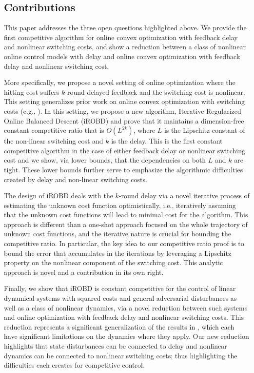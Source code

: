 \subsection{Contributions}
This paper addresses the three open questions highlighted above.  We provide the first competitive algorithm for online convex optimization with feedback delay and nonlinear switching costs, and show a reduction between a class of nonlinear online control models with delay and online convex optimization with feedback delay and nonlinear switching cost. 

More specifically, we propose a novel setting of online optimization where the hitting cost suffers $k$-round delayed feedback and the switching cost is nonlinear. This setting generalizes prior work on online convex optimization with switching costs (e.g., \citep{goel2019beyond,shi2020online}).  In this setting, we propose a new algorithm, Iterative Regularized Online Balanced Descent (iROBD) and prove that it maintains a dimension-free constant competitive ratio that is $O(L^{2k})$, where $L$ is the Lipschitz constant of the non-linear switching cost and $k$ is the delay.  This is the first constant competitive algorithm in the case of either feedback delay or nonlinear switching cost and we show, via lower bounds, that the dependencies on both $L$ and $k$ are tight.  These lower bounds further serve to emphasize the algorithmic difficulties created by delay and non-linear switching costs.

The design of iROBD deals with the $k$-round delay via a novel iterative process of estimating the unknown cost function optimistically, i.e., iteratively assuming that the unknown cost functions will lead to minimal cost for the algorithm.  This approach is different than a one-shot approach focused on the whole trajectory of unknown cost functions, and the iterative nature is crucial for bounding the competitive ratio.  In particular, the key idea to our competitive ratio proof is to bound the error that accumulates in the iterations by leveraging a Lipschitz property on the nonlinear component of the switching cost. This analytic approach is novel and a contribution in its own right. 

Finally, we show that iROBD is constant competitive for the control of linear dynamical systems with squared costs and general adversarial disturbances as well as a class of nonlinear dynamics, via a novel reduction between such systems and online optimization with feedback delay and nonlinear switching costs.  This reduction represents a significant generalization of the results in \citep{goel2019online,shi2020online}, which each have significant limitations on the dynamics where they apply.  Our new reduction highlights that state disturbances can be connected to delay and nonlinear dynamics can be connected to nonlinear switching costs; thus highlighting the difficulties each creates for competitive control.
